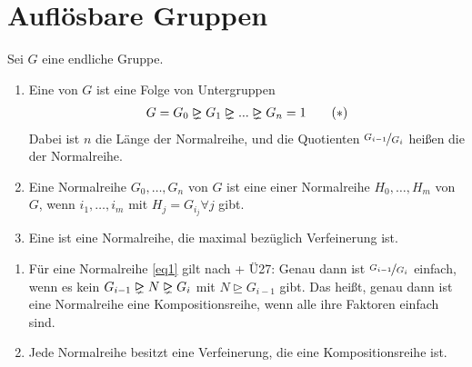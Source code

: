 \section{Auflösbare Gruppen}

Sei $G$ eine endliche Gruppe.

\begin{definition}
	\begin{enumerate}[label=(\alph*)]
		\item Eine  von $G$ ist eine Folge von Untergruppen
		\begin{align}
		\label{eq1}
		G = G_0 \properidealright G_1 \properidealright ... \properidealright G_n = 1\tag{$\ast$}
		\end{align}
		Dabei ist $n$ die Länge der Normalreihe, und die Quotienten $\nicefrac{G_{i-1}}{G_i}$ heißen die  der Normalreihe.
		\item Eine Normalreihe $G_0, \dots, G_n$ von $G$ ist eine  einer Normalreihe $H_0,\dots,H_m$  von $G$, wenn $i_1,\dots,i_m$ mit $H_j = G_{i_{j}} \forall j$ gibt.
		\item Eine  ist eine Normalreihe, die maximal bezüglich Verfeinerung ist.
	\end{enumerate}
\end{definition}

\begin{remark}
	\begin{enumerate}[label=(\alph*)]
		\item Für eine Normalreihe \eqref{eq1} gilt nach  + Ü27:
		Genau dann ist $\nicefrac{G_{i-1}}{G_i}$ einfach, wenn es kein $G_{i-1} \properidealright N \properidealright G_i$ mit $N \unrhd G_{i-1}$ gibt. Das heißt, genau dann ist eine Normalreihe eine Kompositionsreihe, wenn alle ihre Faktoren einfach sind. %
		\item Jede Normalreihe besitzt eine Verfeinerung, die eine Kompositionsreihe ist.
	\end{enumerate}
\end{remark}

